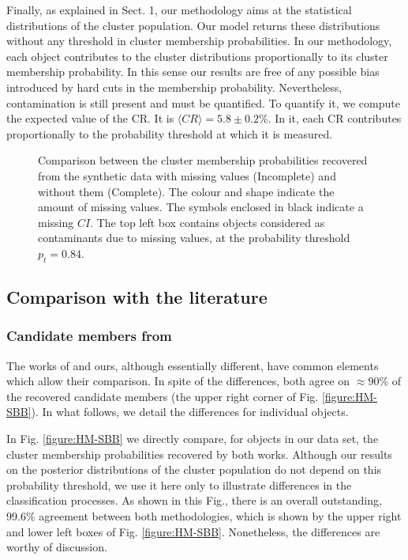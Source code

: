 Finally, as explained in Sect. 1, our methodology aims at the statistical distributions of the cluster population. Our model returns these distributions without any threshold in cluster membership probabilities. In our methodology, each object contributes to the cluster distributions proportionally to its cluster membership probability. In this sense our results are free of any possible bias introduced by hard cuts in the membership probability. Nevertheless, contamination is still present and must be quantified. To quantify it, we compute the expected value of the CR. It is $\langle CR \rangle=5.8\pm 0.2$\%. In it, each CR contributes proportionally to the  probability threshold at which it is measured. 

\begin{figure}[!htp]
\begin{center}
\caption{Comparison between the cluster membership probabilities recovered from the synthetic data with missing values (Incomplete) and without them (Complete). The colour and shape indicate the amount of missing values. The symbols enclosed in black indicate a missing $CI$. The top left box contains objects considered as contaminants due to missing values, at the probability threshold $p_t=0.84$.}
\label{figure:IncVsCom}
\end{center}
\end{figure}
 
\subsection{Comparison with the literature}
\subsubsection{Candidate members from \citet{Bouy2015}}
The works of \citet{Bouy2015} and ours, although essentially different, have common elements which allow their comparison. In spite of the differences, both agree on $\approx 90$\% of the recovered candidate members (the upper right corner of Fig. \ref{figure:HM-SBB}). In what follows, we detail the differences for individual objects.

In Fig. \ref{figure:HM-SBB} we directly compare, for objects in our data set, the cluster membership probabilities recovered by both works. Although our results on the posterior distributions of the cluster population do not depend on this probability threshold, we use it here only to illustrate differences in the classification processes. As shown in this Fig., there is an overall outstanding, 99.6\% agreement between both methodologies, which is shown by the upper right and lower left boxes of Fig. \ref{figure:HM-SBB}. Nonetheless, the differences are worthy of discussion.

